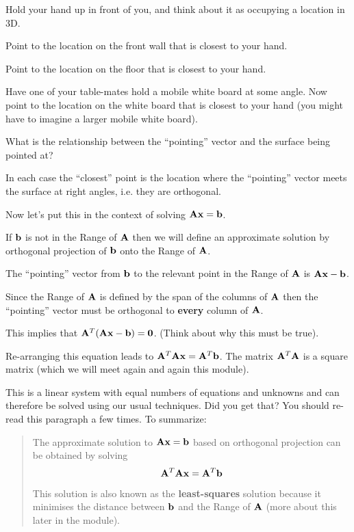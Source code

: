 \begin{prob}
Hold your hand up in front of you, and think about it as occupying a location in 3D.
\be
\item Point to the location on the front wall that is closest to your hand.
\item Point to the location on the floor that is closest to your hand.
\item Have one of your table-mates hold a mobile white board at some angle. Now point to the location on the white board that is closest to your hand (you might have to imagine a larger mobile white board).
\item What is the relationship between the ``pointing'' vector and the surface being pointed at?
\ee
\end{prob}
\begin{sol}
In each case the ``closest'' point is the location where the ``pointing'' vector meets the surface at right angles, i.e. they are orthogonal.
\end{sol}

Now let's put this in the context of solving $\mathbf{A} \mathbf{x} = \mathbf{b}$. 

\bi
\item If $\mathbf{b}$ is not in the Range of $\mathbf{A}$ then we will define an approximate solution by orthogonal projection of $\mathbf{b}$ onto the Range of $\mathbf{A}$. 
\item The ``pointing'' vector from $\mathbf{b}$ to the relevant point in the Range of $\mathbf{A}$ is $\mathbf{A} \mathbf{x} - \mathbf{b}$. 
\item Since the Range of $\mathbf{A}$ is defined by the span of the columns of $\mathbf{A}$ then the ``pointing'' vector must be orthogonal to \textbf{every} column of $\mathbf{A}$. 
\item This implies that $\mathbf{A}^T (\mathbf{A} \mathbf{x} - \mathbf{b}) = \mathbf{0}$. (Think about why this must be true). 
\item Re-arranging this equation leads to $\mathbf{A}^T \mathbf{A} \mathbf{x} = \mathbf{A}^T \mathbf{b}$. The matrix $\mathbf{A}^T \mathbf{A}$ is a square matrix (which we will meet again and again this module). 
\item This is a linear system with equal numbers of equations and unknowns and can therefore be solved using our usual techniques. Did you get that? You should re-read this paragraph a few times. To summarize:
\ei

\begin{quote}
The approximate solution to $\mathbf{A} \mathbf{x} = \mathbf{b}$ based on orthogonal projection can be obtained by solving
\[\mathbf{A}^T \mathbf{A} \mathbf{x} = \mathbf{A}^T \mathbf{b} \]
This solution is also known as the \textbf{least-squares} solution because it minimises the distance between $\mathbf{b}$ and the Range of $\mathbf{A}$ (more about this later in the module).
\end{quote}

